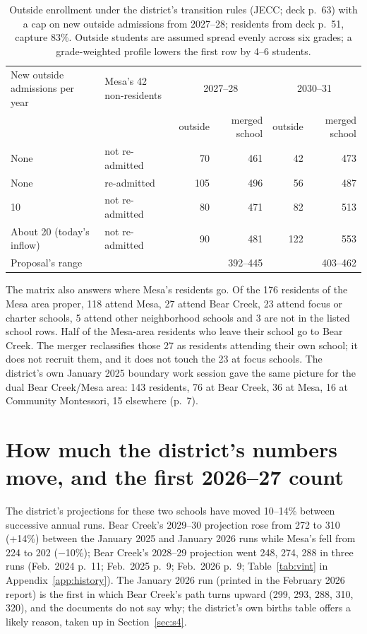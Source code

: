 \documentclass[11pt]{article}
\begin{document}
\begin{table}[htbp]\centering\footnotesize
\caption{Outside enrollment under the district's transition rules (JECC; deck p.\ 63) with a cap on new outside admissions from 2027--28; residents from deck p.\ 51, capture 83\%. Outside students are assumed spread evenly across six grades; a grade-weighted profile lowers the first row by 4--6 students.}\label{tab:newentrants}
\begin{tabular}{llrrrr}
\toprule
New outside admissions per year & Mesa's 42 non-residents & \multicolumn{2}{c}{2027--28} & \multicolumn{2}{c}{2030--31} \\
 & & outside & merged school & outside & merged school \\
\midrule
None & not re-admitted & 70 & 461 & 42 & 473 \\
None & re-admitted & 105 & 496 & 56 & 487 \\
10 & not re-admitted & 80 & 471 & 82 & 513 \\
About 20 (today's inflow) & not re-admitted & 90 & 481 & 122 & 553 \\
\midrule
Proposal's range & & & 392--445 & & 403--462 \\
\bottomrule
\end{tabular}
\end{table}

The matrix also answers where Mesa's residents go. Of the 176 residents of the Mesa area proper, 118 attend Mesa, 27 attend Bear Creek, 23 attend focus or charter schools, 5 attend other neighborhood schools and 3 are not in the listed school rows. Half of the Mesa-area residents who leave their school go to Bear Creek. The merger reclassifies those 27 as residents attending their own school; it does not recruit them, and it does not touch the 23 at focus schools. The district's own January 2025 boundary work session gave the same picture for the dual Bear Creek/Mesa area: 143 residents, 76 at Bear Creek, 36 at Mesa, 16 at Community Montessori, 15 elsewhere (p.\ 7).

\section{How much the district's numbers move, and the first 2026--27 count}\label{sec:s2}
The district's projections for these two schools have moved 10--14\% between successive annual runs. Bear Creek's 2029--30 projection rose from 272 to 310 (+14\%) between the January 2025 and January 2026 runs while Mesa's fell from 224 to 202 ($-$10\%); Bear Creek's 2028--29 projection went 248, 274, 288 in three runs (Feb.\ 2024 p.\ 11; Feb.\ 2025 p.\ 9; Feb.\ 2026 p.\ 9; Table~\ref{tab:vint} in Appendix~\ref{app:history}). The January 2026 run (printed in the February 2026 report) is the first in which Bear Creek's path turns upward (299, 293, 288, 310, 320), and the documents do not say why; the district's own births table offers a likely reason, taken up in Section~\ref{sec:s4}.
\end{document}
